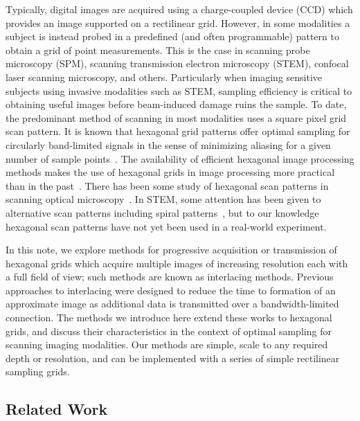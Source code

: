 \documentclass{article}
\begin{document}
Typically, digital images are acquired using a charge-coupled device (CCD) which provides an image supported on a rectilinear grid.
%
However, in some modalities a subject is instead probed in a predefined (and often programmable) pattern to obtain a grid of point measurements.
%
This is the case in scanning probe microscopy (SPM), scanning transmission electron microscopy (STEM), confocal laser scanning microscopy, and others.
%
Particularly when imaging sensitive subjects using invasive modalities such as STEM, sampling efficiency is critical to obtaining useful images before beam-induced damage ruins the sample.
%
To date, the predominant method of scanning in most modalities uses a square pixel grid scan pattern.
%
It is known that hexagonal grid patterns offer optimal sampling for circularly band-limited signals in the sense of minimizing aliasing for a given number of sample points~\citep{petersen1962}.
%
The availability of efficient hexagonal image processing methods makes the use of hexagonal grids in image processing more practical than in the past~\citep{birdsong2016hexfft,middleton2006hexagonal}.
%
There has been some study of hexagonal scan patterns in scanning optical microscopy~\citep{heintzmann2007}.
%
In STEM, some attention has been given to alternative scan patterns including spiral patterns~\citep{sang2016dynamic}, but to our knowledge hexagonal scan patterns have not yet been used in a real-world experiment.


In this note, we explore methods for progressive acquisition or transmission of hexagonal grids which acquire multiple images of increasing resolution each with a full field of view; such methods are known as interlacing methods.
%
Previous approaches to interlacing were designed to reduce the time to formation of an approximate image as additional data is transmitted over a bandwidth-limited connection.
%
The methods we introduce here extend these works to hexagonal grids, and discuss their characteristics in the context of optimal sampling for scanning imaging modalities.
%
Our methods are simple, scale to any required depth or resolution, and can be
implemented with a series of simple rectilinear sampling grids.

\subsection{Related Work}
\label{sec:wavelets}
\end{document}

